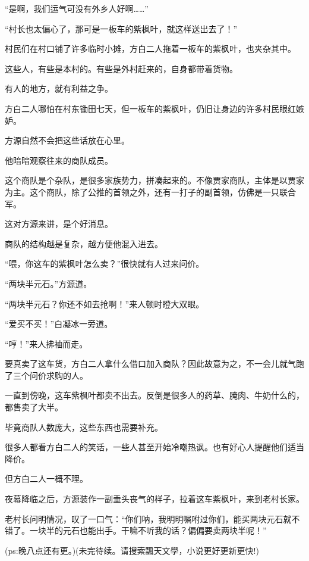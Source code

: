\begin{this_body}
“是啊，我们运气可没有外乡人好啊……”

“村长也太偏心了，那可是一板车的紫枫叶，就这样送出去了！”

村民们在村口铺了许多临时小摊，方白二人拖着一板车的紫枫叶，也夹杂其中。

这些人，有些是本村的。有些是外村赶来的，自身都带着货物。

有人的地方，就有利益之争。

方白二人哪怕在村东锄田七天，但一板车的紫枫叶，仍旧让身边的许多村民眼红嫉妒。

方源自然不会把这些话放在心里。

他暗暗观察往来的商队成员。

这个商队是个杂队，是很多家族势力，拼凑起来的。不像贾家商队，主体是以贾家为主。这个商队，除了公推的首领之外，还有一打子的副首领，仿佛是一只联合军。

这对方源来讲，是个好消息。

商队的结构越是复杂，越方便他混入进去。

“喂，你这车的紫枫叶怎么卖？”很快就有人过来问价。

“两块半元石。”方源道。

“两块半元石？你还不如去抢啊！”来人顿时瞪大双眼。

“爱买不买！”白凝冰一旁道。

“哼！”来人拂袖而走。

要真卖了这车货，方白二人拿什么借口加入商队？因此故意为之，不一会儿就气跑了三个问价求购的人。

一直到傍晚，这车紫枫叶都卖不出去。反倒是很多人的药草、腌肉、牛奶什么的，都售卖了大半。

毕竟商队人数庞大，这些东西也需要补充。

很多人都看方白二人的笑话，一些人甚至开始冷嘲热讽。也有好心人提醒他们适当降价。

但方白二人一概不理。

夜幕降临之后，方源装作一副垂头丧气的样子，拉着这车紫枫叶，来到老村长家。

老村长问明情况，叹了一口气：“你们呐，我明明嘱咐过你们，能买两块元石就不错了。一块半的元石也能出手。干嘛不听我的话？偏偏要卖两块半呢！”

(ps:晚八点还有更。)(未完待续。请搜索飄天文學，小说更好更新更快!)

\end{this_body}

